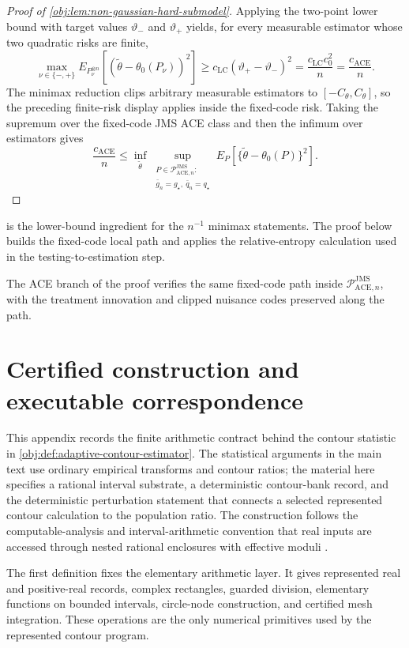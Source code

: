\documentclass[11pt]{article}
\begin{document}
\begin{proof}[Proof of \cref{obj:lem:non-gaussian-hard-submodel}]
Applying the two-point lower bound with target values \(\vartheta_-\) and \(\vartheta_+\) yields, for every measurable estimator whose two quadratic risks are finite,
\[
\max_{\nu\in\{-,+\}}
E_{P_\nu^{\otimes n}}\!\left[(\widetilde\theta-\theta_0(P_\nu))^2\right]
\ge
c_{\mathrm{LC}}(\vartheta_+-\vartheta_-)^2
=
\frac{c_{\mathrm{LC}}c_0^2}{n}
=
\frac{c_{\mathrm{ACE}}}{n}.
\]
The minimax reduction clips arbitrary measurable estimators to \([-C_{\theta},C_{\theta}]\), so the preceding finite-risk display applies inside the fixed-code risk.  Taking the supremum over the fixed-code JMS ACE class and then the infimum over estimators gives
\[
\frac{c_{\mathrm{ACE}}}{n}
\le
\inf_{\widetilde\theta}
\sup_{\substack{P\in\mathcal P_{\mathrm{ACE},n}^{\mathrm{JMS}}:\\
\bar g_n=g_\star,\ \bar q_n=q_\star}}
E_P\!\left[\{\widetilde\theta-\theta_0(P)\}^2\right].
\]
\end{proof}

 is the lower-bound ingredient for the \(n^{-1}\) minimax statements. The proof below builds the fixed-code local path and applies the relative-entropy calculation used in the testing-to-estimation step.

The ACE branch of the proof verifies the same fixed-code path inside \(\mathcal P_{\mathrm{ACE},n}^{\mathrm{JMS}}\), with the treatment innovation and clipped nuisance codes preserved along the path.


\section{Certified construction and executable correspondence}

This appendix records the finite arithmetic contract behind the contour statistic in \cref{obj:def:adaptive-contour-estimator}. The statistical arguments in the main text use ordinary empirical transforms and contour ratios; the material here specifies a rational interval substrate, a deterministic contour-bank record, and the deterministic perturbation statement that connects a selected represented contour calculation to the population ratio. The construction follows the computable-analysis and interval-arithmetic convention that real inputs are accessed through nested rational enclosures with effective moduli \citep{Weihrauch2000,Ko1991,Moore1966}.

The first definition fixes the elementary arithmetic layer. It gives represented real and positive-real records, complex rectangles, guarded division, elementary functions on bounded intervals, circle-node construction, and certified mesh integration. These operations are the only numerical primitives used by the represented contour program.
\end{document}
